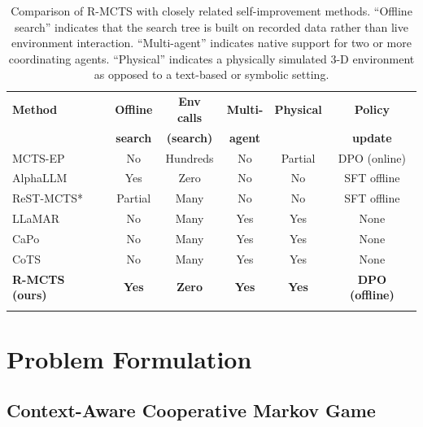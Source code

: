 \documentclass[pdflatex,sn-mathphys-num]{sn-jnl}
\theoremstyle{thmstyleone}
\theoremstyle{thmstyletwo}
\theoremstyle{thmstylethree}
\newcommand{\RMCTS}{\textsc{R-MCTS}}
\begin{document}
\begin{table}[t]
\caption{Comparison of \RMCTS{} with closely related self-improvement
methods. ``Offline search'' indicates that the search tree is built on
recorded data rather than live environment interaction.
``Multi-agent'' indicates native support for two or more coordinating
agents.
``Physical'' indicates a physically simulated 3-D environment as
opposed to a text-based or symbolic setting.}\label{tab:comparison}
\begin{tabular*}{\textwidth}{@{\extracolsep\fill}lccccc@{}}
\toprule
\textbf{Method} & \textbf{Offline} & \textbf{Env calls}
& \textbf{Multi-} & \textbf{Physical} & \textbf{Policy} \\
& \textbf{search} & \textbf{(search)}
& \textbf{agent} & & \textbf{update} \\
\midrule
MCTS-EP~\cite{xu2025mcts}
  & No & Hundreds & No & Partial & DPO (online) \\
AlphaLLM~\cite{ye2024alphallm}
  & Yes & Zero & No & No & SFT offline \\
ReST-MCTS*~\cite{zhang2024rest}
  & Partial & Many & No & No & SFT offline \\
LLaMAR~\cite{nayak2024llamar}
  & No & Many & Yes & Yes & None \\
CaPo~\cite{liu2025capo}
  & No & Many & Yes & Yes & None \\
CoTS~\cite{zu2025collaborative}
  & No & Many & Yes & Yes & None \\
\midrule
\textbf{\RMCTS{} (ours)}
  & \textbf{Yes} & \textbf{Zero}
  & \textbf{Yes} & \textbf{Yes} & \textbf{DPO (offline)} \\
\botrule
\end{tabular*}
\end{table}

\section{Problem Formulation}\label{sec:problem}

\subsection{Context-Aware Cooperative Markov Game}
\end{document}
